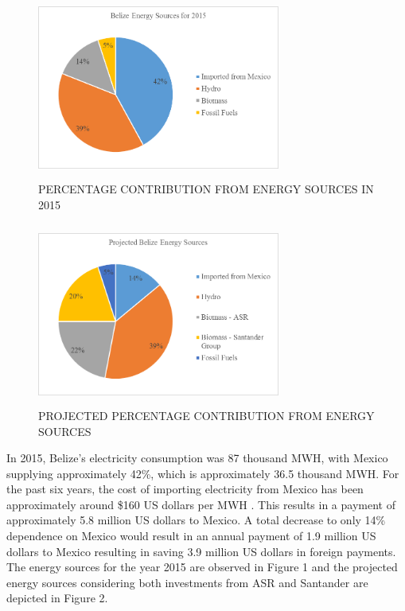 \documentclass[twocolumn,10pt]{asme2e}
\begin{document}
\begin{figure}[ht]
	\centering
	\includegraphics[width = 8cm, height = 6cm]{Energy_Sources_2015.png}
	\caption{PERCENTAGE CONTRIBUTION FROM ENERGY SOURCES IN 2015}
\end{figure} 

\begin{figure}[ht]
	\centering
	\includegraphics[width = 8cm, height = 6cm]{Energy_Sources_Projected.png}
	\caption{PROJECTED PERCENTAGE CONTRIBUTION FROM ENERGY SOURCES}
\end{figure} 

In 2015, Belize's electricity consumption was 87 thousand MWH, with Mexico supplying approximately 42\%, which is approximately 36.5 thousand MWH. For the past six years, the cost of importing electricity from Mexico has been approximately around \$160 US dollars per MWH \cite{asr_report}. This results in a payment of approximately 5.8 million US dollars to Mexico. A total decrease to only 14\% dependence on Mexico would result in an annual payment of 1.9 million US dollars to Mexico resulting in saving 3.9 million US dollars in foreign payments. The energy sources for the year 2015 are observed in Figure 1 and the projected energy sources considering both investments from ASR and Santander are depicted in Figure 2.  
\end{document}
